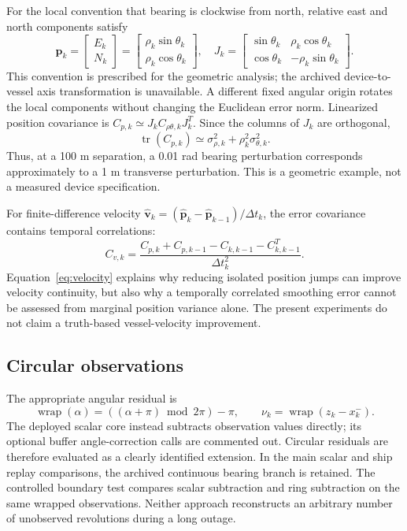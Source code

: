 \documentclass[12pt,a4paper]{article}
\newcommand{\wrap}{\operatorname{wrap}}
\begin{document}
For the local convention that bearing is clockwise from north, relative east and north components satisfy
\begin{equation}
 \mathbf p_k=\begin{bmatrix}E_k\\N_k\end{bmatrix}
 =\begin{bmatrix}\rho_k\sin\theta_k\\\rho_k\cos\theta_k\end{bmatrix},\quad
 J_k=\begin{bmatrix}\sin\theta_k&\rho_k\cos\theta_k\\
 \cos\theta_k&-\rho_k\sin\theta_k\end{bmatrix}.
 \label{eq:geometry}
\end{equation}
This convention is prescribed for the geometric analysis; the archived device-to-vessel axis transformation is unavailable. A different fixed angular origin rotates the local components without changing the Euclidean error norm. Linearized position covariance is $C_{p,k}\simeq J_k C_{\rho\theta,k}J_k^T$. Since the columns of $J_k$ are orthogonal,
\begin{equation}
 \operatorname{tr}(C_{p,k})\simeq \sigma_{\rho,k}^2+
 \rho_k^2\sigma_{\theta,k}^2.
 \label{eq:trace}
\end{equation}
Thus, at a 100 m separation, a 0.01 rad bearing perturbation corresponds approximately to a 1 m transverse perturbation. This is a geometric example, not a measured device specification.

For finite-difference velocity $\hat{\mathbf v}_k=(\hat{\mathbf p}_k-\hat{\mathbf p}_{k-1})/\Delta t_k$, the error covariance contains temporal correlations:
\begin{equation}
 C_{v,k}=\frac{C_{p,k}+C_{p,k-1}-C_{k,k-1}-C_{k,k-1}^T}{\Delta t_k^2}.
 \label{eq:velocity}
\end{equation}
Equation~\eqref{eq:velocity} explains why reducing isolated position jumps can improve velocity continuity, but also why a temporally correlated smoothing error cannot be assessed from marginal position variance alone. The present experiments do not claim a truth-based vessel-velocity improvement.

\subsection{Circular observations}
The appropriate angular residual is
\begin{equation}
 \wrap(\alpha)=((\alpha+\pi)\bmod 2\pi)-\pi,\qquad
 \nu_k=\wrap(z_k-x_k^-).
 \label{eq:wrap}
\end{equation}
The deployed scalar core instead subtracts observation values directly; its optional buffer angle-correction calls are commented out. Circular residuals are therefore evaluated as a clearly identified extension. In the main scalar and ship replay comparisons, the archived continuous bearing branch is retained. The controlled boundary test compares scalar subtraction and ring subtraction on the same wrapped observations. Neither approach reconstructs an arbitrary number of unobserved revolutions during a long outage.
\end{document}
